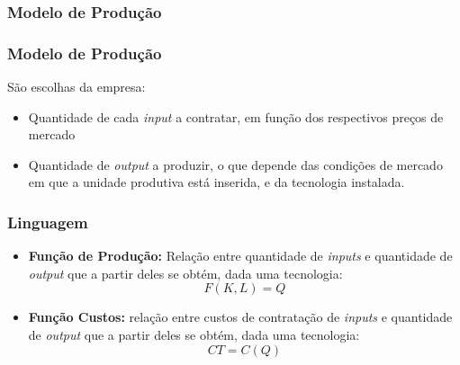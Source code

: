 \begin{frame}
	\frametitle{Modelo de Produ\c c\~ao}
	\begin{center}
	\end{center}

\end{frame}

\begin{frame}
	\frametitle{Modelo de Produ\c c\~ao}
	S\~ao escolhas da empresa:
	\begin{itemize}
		\item Quantidade de cada \emph{input} a contratar, em fun\c c\~ao dos respectivos pre\c cos de mercado
		\item Quantidade de \emph{output} a produzir, o que depende das condi\c c\~oes de mercado em que a unidade produtiva est\'a inserida, e da tecnologia instalada.
	\end{itemize}
\end{frame}

\begin{frame}
	\frametitle{Linguagem}
	\begin{itemize}
		\item \textbf{Fun\c c\~ao de Produ\c c\~ao:} Rela\c c\~ao entre quantidade de \emph{inputs} e quantidade de \emph{output} que a partir deles se obt\'em, dada uma tecnologia:\[F(K,L)=Q\] \pause
		\item \textbf{Fun\c c\~ao Custos:} rela\c c\~ao entre custos de contrata\c c\~ao de \emph{inputs} e quantidade de \emph{output} que a partir deles se obt\'em, dada uma tecnologia:\[CT=C(Q)\]
	\end{itemize}
\end{frame}

